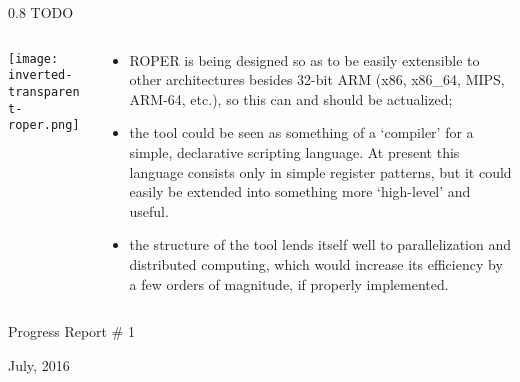 \documentclass[9pt]{beamer}
\begin{document}
\begin{frame}{0.8 TODO}


\begin{columns}

    \begin{column}{0.3\textwidth}
    \texttt{[image: inverted-transparent-roper.png]}
    \end{column}
    \begin{column}{0.7\textwidth}
    
    \begin{itemize}
    \item ROPER is being designed so as to be easily extensible to other architectures besides 32-bit ARM (x86, x86\_64, MIPS, ARM-64, etc.), so this can and should be actualized;
    \item the tool could be seen as something of a `compiler' for a simple, declarative scripting language. At present this language consists only in simple register patterns, but it could easily be extended into something more `high-level' and useful.
    \item the structure of the tool lends itself well to parallelization and distributed computing, which would increase its efficiency by a few orders of magnitude, if properly implemented.
    \end{itemize} 
    
    \end{column}
\end{columns}
\end{frame}


\begin{frame}
\begin{center}    
    {\huge Progress Report \# 1}
    \vspace{.3cm}
    
    {\large July, 2016}
    \end{center} 
    
\end{frame}
\end{document}
